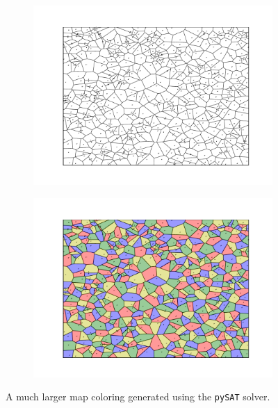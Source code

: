 \documentclass{article}
\begin{document}
    \vspace{-8mm}
    \begin{figure}[H]
        \centering
        \begin{subfigure}{0.49\textwidth}
            \centering
            \includegraphics[scale = .5]{sp23/hw-supplements/hw3-supp/images/blank_map2.pdf}
        \end{subfigure}
        \begin{subfigure}{0.49\textwidth}
            \centering
            \includegraphics[scale = .5]{sp23/hw-supplements/hw3-supp/images/colored_map2.pdf}
        \end{subfigure}
        \caption{A much larger map coloring generated using the \lstinline{pySAT} solver.}
        \label{fig:pySAT}
    \end{figure}
\end{document}
